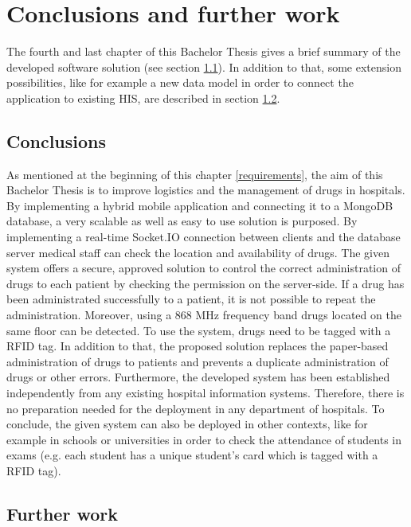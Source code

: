 \chapter{Conclusions and further work}
\label{Kap4}

The fourth and last chapter of this Bachelor Thesis gives a brief summary of the developed software solution (see section \ref{conclusion}). In addition to that, some extension possibilities, like for example a new data model in order to connect the application to existing HIS, are described in section \ref{furtherwork}. 

\section{Conclusions} \label{conclusion}

As mentioned at the beginning of this chapter \ref{requirements}, the aim of this Bachelor Thesis is to improve logistics and the management of drugs in hospitals. By implementing a hybrid mobile application and connecting it to a MongoDB database, a very scalable as well as easy to use solution is purposed.
By implementing a real-time Socket.IO connection between clients and the database server medical staff can check the location and availability of drugs.
The given system offers a secure, approved solution to control the correct administration of drugs to each patient by checking the permission on the server-side. If a drug has been administrated successfully to a patient, it is not possible to repeat the administration. 
Moreover, using a 868 MHz frequency band drugs located on the same floor can be detected. To use the system, drugs need to be tagged with a RFID tag. 
In addition to that, the proposed solution replaces the paper-based administration of drugs to patients and prevents a duplicate administration of drugs or other errors.
Furthermore, the developed system has been established independently from any existing hospital information systems. Therefore, there is no preparation needed for the deployment in any department of hospitals.
To conclude, the given system can also be deployed in other contexts, like for example in schools or universities in order to check the attendance of students in exams (e.g. each student has a unique student's card which is tagged with a RFID tag).

\section{Further work} \label{furtherwork}

